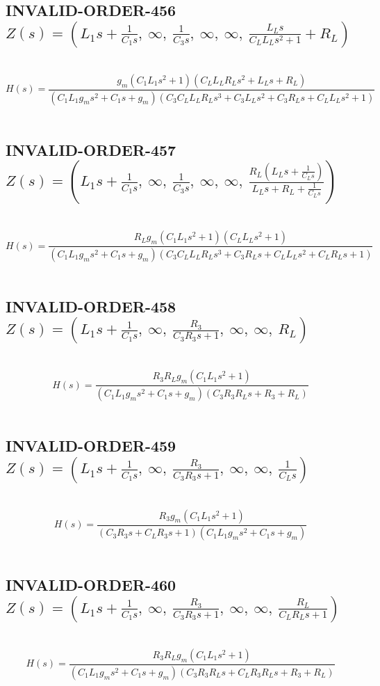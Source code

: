 \documentclass{article}
\begin{document}
\subsection{INVALID-ORDER-456 $Z(s) = \left( L_{1} s + \frac{1}{C_{1} s}, \  \infty, \  \frac{1}{C_{3} s}, \  \infty, \  \infty, \  \frac{L_{L} s}{C_{L} L_{L} s^{2} + 1} + R_{L}\right)$ } \ 
\textbf{\[H(s) = \frac{g_{m} \left(C_{1} L_{1} s^{2} + 1\right) \left(C_{L} L_{L} R_{L} s^{2} + L_{L} s + R_{L}\right)}{\left(C_{1} L_{1} g_{m} s^{2} + C_{1} s + g_{m}\right) \left(C_{3} C_{L} L_{L} R_{L} s^{3} + C_{3} L_{L} s^{2} + C_{3} R_{L} s + C_{L} L_{L} s^{2} + 1\right)}\] } \ 
\subsection{INVALID-ORDER-457 $Z(s) = \left( L_{1} s + \frac{1}{C_{1} s}, \  \infty, \  \frac{1}{C_{3} s}, \  \infty, \  \infty, \  \frac{R_{L} \left(L_{L} s + \frac{1}{C_{L} s}\right)}{L_{L} s + R_{L} + \frac{1}{C_{L} s}}\right)$ } \ 
\textbf{\[H(s) = \frac{R_{L} g_{m} \left(C_{1} L_{1} s^{2} + 1\right) \left(C_{L} L_{L} s^{2} + 1\right)}{\left(C_{1} L_{1} g_{m} s^{2} + C_{1} s + g_{m}\right) \left(C_{3} C_{L} L_{L} R_{L} s^{3} + C_{3} R_{L} s + C_{L} L_{L} s^{2} + C_{L} R_{L} s + 1\right)}\] } \ 
\subsection{INVALID-ORDER-458 $Z(s) = \left( L_{1} s + \frac{1}{C_{1} s}, \  \infty, \  \frac{R_{3}}{C_{3} R_{3} s + 1}, \  \infty, \  \infty, \  R_{L}\right)$ } \ 
\textbf{\[H(s) = \frac{R_{3} R_{L} g_{m} \left(C_{1} L_{1} s^{2} + 1\right)}{\left(C_{1} L_{1} g_{m} s^{2} + C_{1} s + g_{m}\right) \left(C_{3} R_{3} R_{L} s + R_{3} + R_{L}\right)}\] } \ 
\subsection{INVALID-ORDER-459 $Z(s) = \left( L_{1} s + \frac{1}{C_{1} s}, \  \infty, \  \frac{R_{3}}{C_{3} R_{3} s + 1}, \  \infty, \  \infty, \  \frac{1}{C_{L} s}\right)$ } \ 
\textbf{\[H(s) = \frac{R_{3} g_{m} \left(C_{1} L_{1} s^{2} + 1\right)}{\left(C_{3} R_{3} s + C_{L} R_{3} s + 1\right) \left(C_{1} L_{1} g_{m} s^{2} + C_{1} s + g_{m}\right)}\] } \ 
\subsection{INVALID-ORDER-460 $Z(s) = \left( L_{1} s + \frac{1}{C_{1} s}, \  \infty, \  \frac{R_{3}}{C_{3} R_{3} s + 1}, \  \infty, \  \infty, \  \frac{R_{L}}{C_{L} R_{L} s + 1}\right)$ } \ 
\textbf{\[H(s) = \frac{R_{3} R_{L} g_{m} \left(C_{1} L_{1} s^{2} + 1\right)}{\left(C_{1} L_{1} g_{m} s^{2} + C_{1} s + g_{m}\right) \left(C_{3} R_{3} R_{L} s + C_{L} R_{3} R_{L} s + R_{3} + R_{L}\right)}\] } \ 
\end{document}

